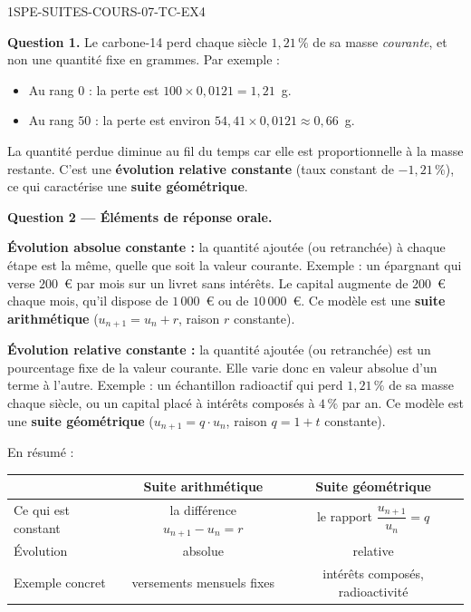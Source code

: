 \begin{corrige}{1SPE-SUITES-COURS-07-TC-EX4}

\textbf{Question 1.} Le carbone-14 perd chaque siècle $1{,}21\,\%$ de sa masse \textit{courante}, et non une quantité fixe en grammes. Par exemple :

\begin{itemize}
  \item Au rang $0$ : la perte est $100 \times 0{,}0121 = 1{,}21$~g.
  \item Au rang $50$ : la perte est environ $54{,}41 \times 0{,}0121 \approx 0{,}66$~g.
\end{itemize}

La quantité perdue diminue au fil du temps car elle est proportionnelle à la masse restante. C'est une \textbf{évolution relative constante} (taux constant de $-1{,}21\,\%$), ce qui caractérise une \textbf{suite géométrique}.

\textbf{Question 2 — Éléments de réponse orale.}

\textbf{Évolution absolue constante :} la quantité ajoutée (ou retranchée) à chaque étape est la même, quelle que soit la valeur courante. Exemple : un épargnant qui verse $200$~€ par mois sur un livret sans intérêts. Le capital augmente de $200$~€ chaque mois, qu'il dispose de $1\,000$~€ ou de $10\,000$~€. Ce modèle est une \textbf{suite arithmétique} ($u_{n+1} = u_n + r$, raison $r$ constante).

\textbf{Évolution relative constante :} la quantité ajoutée (ou retranchée) est un pourcentage fixe de la valeur courante. Elle varie donc en valeur absolue d'un terme à l'autre. Exemple : un échantillon radioactif qui perd $1{,}21\,\%$ de sa masse chaque siècle, ou un capital placé à intérêts composés à $4\,\%$ par an. Ce modèle est une \textbf{suite géométrique} ($u_{n+1} = q \cdot u_n$, raison $q = 1 + t$ constante).


En résumé :

\begin{center}
\begin{tabular}{|l|c|c|}
\hline
 & Suite arithmétique & Suite géométrique \\
\hline
Ce qui est constant & la différence $u_{n+1} - u_n = r$ & le rapport $\dfrac{u_{n+1}}{u_n} = q$ \\
Évolution & absolue & relative \\
Exemple concret & versements mensuels fixes & intérêts composés, radioactivité \\
\hline
\end{tabular}
\end{center}

\end{corrige}
